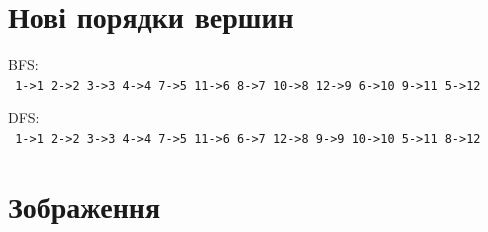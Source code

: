 \pagebreak
\section{Нові порядки вершин}

\begin{minipage}[t]{0.4\linewidth}
  \begin{center}
    \begin{framed}
      \noindent%
      BFS:\\
      \footnotesize\texttt{%
        1->1 2->2 3->3 4->4 7->5 11->6 8->7 10->8 12->9 6->10 9->11 5->12
      }
    \end{framed}
  \end{center}
\end{minipage}
\hfill
\begin{minipage}[t]{0.4\linewidth}
  \begin{center}
    \begin{framed}
      \noindent%
      DFS:\\
      \footnotesize\texttt{%
        1->1 2->2 3->3 4->4 7->5 11->6 6->7 12->8 9->9 10->10 5->11 8->12
      }
    \end{framed}
  \end{center}
\end{minipage}
\hfill

\section{Зображення}


